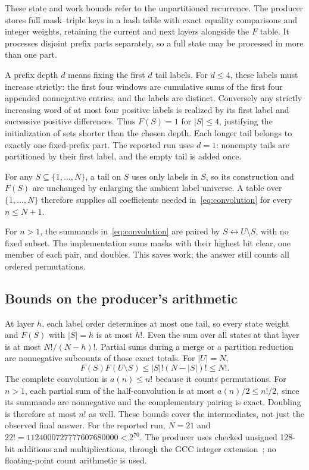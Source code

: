 \documentclass[11pt]{article}
\theoremstyle{definition}
\theoremstyle{remark}
\begin{document}
These state and work bounds refer to the unpartitioned recurrence. The
producer stores full mask--triple keys in a hash table with exact equality
comparisons and integer weights, retaining the current and next layers
alongside the $F$ table. It processes disjoint prefix parts separately,
so a full state may be processed in more than one part.

A prefix depth $d$ means fixing the first $d$ tail labels. For $d\leq4$,
these labels must increase strictly: the first four windows are cumulative
sums of the first four appended nonnegative entries, and the labels are
distinct. Conversely any strictly increasing word of at most four positive
labels is realized by its first label and successive positive differences.
Thus $F(S)=1$ for $|S|\leq4$, justifying the initialization of sets shorter
than the chosen depth. Each longer tail belongs to exactly one fixed-prefix
part. The reported run uses $d=1$: nonempty tails are partitioned by their
first label, and the empty tail is added once.

For any $S\subseteq\{1,\ldots,N\}$, a tail on $S$ uses only labels in $S$,
so its construction and $F(S)$ are unchanged by enlarging the ambient label
universe. A table over $\{1,\ldots,N\}$ therefore supplies all coefficients
needed in~\eqref{eq:convolution} for every $n\leq N+1$.

For $n>1$, the summands in~\eqref{eq:convolution} are paired by
$S\leftrightarrow U\setminus S$, with no fixed subset. The implementation
sums masks with their highest bit clear, one member of each pair, and doubles.
This saves work; the answer still
counts all ordered permutations.

\subsection{Bounds on the producer's arithmetic}
\label{sec:prod-arithmetic}

At layer $h$, each label order determines at most one tail, so every state
weight and $F(S)$ with $|S|=h$ is at most $h!$. Even the sum over all states
at that layer is at most $N!/(N-h)!$. Partial sums during a merge or a
partition reduction are nonnegative subcounts of those exact totals.
For $|U|=N$,
\[
 F(S)F(U\setminus S)\leq |S|!(N-|S|)!\leq N!.
\]
The complete convolution is $a(n)\leq n!$ because it counts permutations.
For $n>1$, each partial sum of the half-convolution is at most
$a(n)/2\leq n!/2$, since its summands are nonnegative and the complementary
pairing is exact. Doubling is therefore at most $n!$ as well.
These bounds cover the intermediates, not just the
observed final answer. For the reported run, $N=21$ and
$22!=1124000727777607680000<2^{70}$. The producer uses checked unsigned
128-bit additions and multiplications, through the GCC integer
extension~\cite{gcc}; no floating-point count arithmetic is used.
\end{document}
